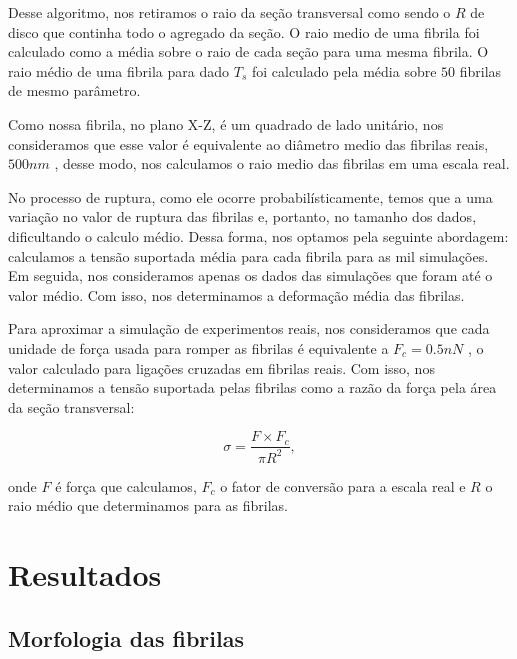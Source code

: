 \documentclass{report}
\begin{document}
        Desse algoritmo, nos retiramos o raio da seção transversal como sendo o \(R\) de disco que continha todo o agregado 
        da seção. O raio medio de uma fibrila foi calculado como a média sobre o raio de cada seção para uma mesma fibrila.
        O raio médio de uma fibrila para dado \(T_{s}\) foi calculado pela média sobre \(50\) fibrilas de mesmo parâmetro.

        Como nossa fibrila, no plano X-Z, é um quadrado de lado unitário, nos consideramos que esse valor é equivalente
        ao diâmetro medio das fibrilas reais, \(500 nm\) \cite{KADLER1996, Parry1984}, desse modo, nos calculamos o raio medio
        das fibrilas em uma escala real.

        No processo de ruptura, como ele ocorre probabilísticamente, temos que a uma variação no valor de ruptura das fibrilas
        e, portanto, no tamanho dos dados, dificultando o calculo médio. Dessa forma, nos optamos pela seguinte abordagem: calculamos
        a tensão suportada média para cada fibrila para as mil simulações. Em seguida, nos consideramos apenas os dados das simulações
        que foram até o valor médio. Com isso, nos determinamos a deformação média das fibrilas. 

        Para aproximar a simulação de experimentos reais, nos consideramos que cada unidade de força usada para romper as fibrilas é
        equivalente a \( F_{c} = 0.5 nN\) \cite{Pandolfi2019AMM}, o valor calculado para ligações cruzadas em fibrilas reais. Com isso, 
        nos determinamos a tensão suportada pelas fibrilas como a razão da força pela área da seção transversal:

        \begin{equation}
            \sigma = \frac{F \times F_{c}}{\pi R^{2}},
        \end{equation}

        \noindent onde \(F\) é força que calculamos,  \( F_{c}\) o fator de conversão para a escala real e \(R\) o raio médio que determinamos
        para as fibrilas.

    \section{Resultados}
        \subsection{Morfologia das fibrilas}
    
\end{document}
